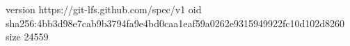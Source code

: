 version https://git-lfs.github.com/spec/v1
oid sha256:4bb3d98e7cab9b3794fa9e4bd0caa1eaf59a0262e9315949922fc10d102d8260
size 24559
